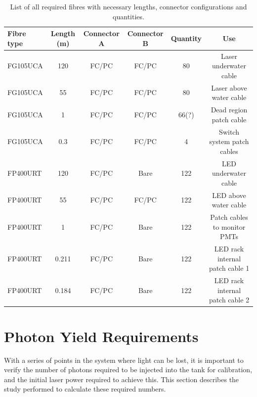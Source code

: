 \documentclass[a4paper,11pt]{article}
\begin{document}
\begin{table}[h]
\centering
\begin{tabular}{lccccc}
\hline
Fibre type & Length (m) & Connector A & Connector B & Quantity & Use \\ \hline
FG105UCA   &  120   &   FC/PC     &  FC/PC      &    80  & Laser underwater cable  \\
FG105UCA   &   55   &   FC/PC     &  FC/PC      &    80  & Laser above water cable    \\
FG105UCA   &    1   &   FC/PC     &  FC/PC      &    66{\color{red}(?)} &  Dead region patch cable \\
FG105UCA   &  0.3   &   FC/PC     &  FC/PC      &   4  & Switch system patch cables \\
FP400URT   &  120   &   FC/PC     &  Bare       & 122  & LED underwater cable   \\
FP400URT   &   55   &   FC/PC     &  FC/PC      & 122   & LED above water cable   \\
FP400URT   &    1   &   FC/PC     &  Bare       & 122   & Patch cables to monitor PMTs  \\ 
FP400URT   &  0.211   &   FC/PC    &  Bare       & 122   & LED rack internal patch cable 1  \\ 
FP400URT   &   0.184   &   FC/PC     &  Bare       & 122  & LED rack internal patch cable 2  \\ 
\hline
\end{tabular}
\caption{List of all required fibres with necessary lengths, connector configurations and quantities.}\label{tab:fibrelengths}
\end{table}

\clearpage

\section{Photon Yield Requirements}

With a series of points in the system where light can be lost, it is important to verify the number of photons required to be injected into the tank for calibration, and the initial laser power required to achieve this. This section describes the study performed to calculate these required numbers.
\end{document}
